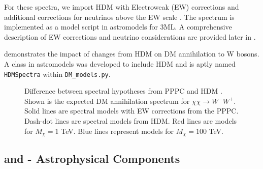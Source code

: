 For these spectra, we import HDM with Electroweak (EW) corrections and additional corrections for neutrinos above the EW scale \cite{HDMSpectra}.
The spectrum is implemented as a model script in astromodels for 3ML.
A comprehensive description of EW corrections and neutrino considerations are provided later in .

 demonstrates the impact of changes from HDM on DM annihilation to W bosons.
A class in astromodels was developed to include HDM and is aptly named \texttt{HDMSpectra} within \texttt{DM\_models.py}.

\begin{figure}[t]
\caption{Difference between spectral hypotheses from PPPC \cite{Cirelli_2011} and HDM \cite{HDMSpectra}. Shown is the expected DM annihilation spectrum for $\chi\chi \rightarrow W^-W^+$. Solid lines are spectral models with EW corrections from the PPPC. Dash-dot lines are spectral models from HDM. Red lines are models for $M_\chi = 1$ TeV. Blue lines represent models for $M_\chi = 100$ TeV.}
\label{fig:pppc_vs_hdm}
\end{figure}

\subsection{\J and \D - Astrophysical Components}\label{sec:mtd_spatialmodel}

